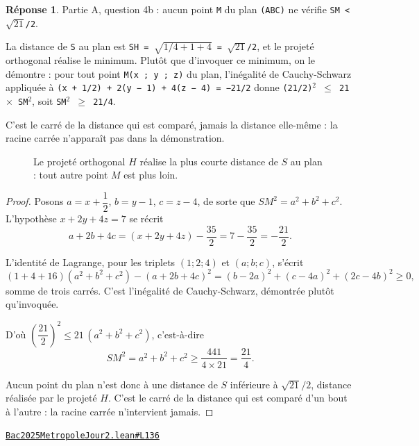 \documentclass[11pt,a4paper]{article}
\theoremstyle{definition}
\theoremstyle{plain}
\theoremstyle{definition}
\newtheorem*{reponse}{Réponse}
\newcommand{\source}[2]{\par\smallskip\noindent\hfill{\footnotesize\href{#1}{\texttt{#2}}}\par\smallskip}
\begin{document}
\begin{reponse}
Partie A, question 4b : aucun point \texttt{M} du plan \texttt{(ABC)} ne vérifie \texttt{SM < \(\sqrt{21}\)/2}.

La distance de \texttt{S} au plan est \texttt{SH = \(\sqrt{1/4 + 1 + 4}\) = \(\sqrt{21}\)/2}, et le projeté orthogonal
réalise le minimum. Plutôt que d'invoquer ce minimum, on le démontre : pour tout point
\texttt{M(x ; y ; z)} du plan, l'inégalité de Cauchy-Schwarz appliquée à
\texttt{(x + 1/2) + 2(y − 1) + 4(z − 4) = −21/2} donne \texttt{(21/2)\(^{2}\) \(\le\) 21 \(\times\) SM\(^{2}\)}, soit
\texttt{SM\(^{2}\) \(\ge\) 21/4}.

C'est le carré de la distance qui est comparé, jamais la distance elle-même : la
racine carrée n'apparaît pas dans la démonstration.
\end{reponse}

\begin{figure}[h]
\centering

\caption{Le projeté orthogonal \(H\) réalise la plus courte distance de \(S\) au plan : tout autre point \(M\) est plus loin.}
\end{figure}
\begin{proof}
Posons $a = x + \dfrac{1}{2}$, $b = y - 1$, $c = z - 4$, de sorte que $SM^2 = a^2 + b^2 +
c^2$. L'hypothèse $x + 2y + 4z = 7$ se récrit
\[ a + 2b + 4c = (x + 2y + 4z) - \frac{35}{2} = 7 - \frac{35}{2} = -\frac{21}{2} . \]

L'identité de Lagrange, pour les triplets $(1 ; 2 ; 4)$ et $(a ; b ; c)$, s'écrit
\[ (1 + 4 + 16)(a^2 + b^2 + c^2) - (a + 2b + 4c)^2
   = (b - 2a)^2 + (c - 4a)^2 + (2c - 4b)^2 \ge 0 , \]
somme de trois carrés. C'est l'inégalité de Cauchy-Schwarz, démontrée plutôt qu'invoquée.

D'où $\left(\dfrac{21}{2}\right)^2 \le 21\,(a^2 + b^2 + c^2)$, c'est-à-dire
\[ SM^2 = a^2 + b^2 + c^2 \ge \frac{441}{4 \times 21} = \frac{21}{4} . \]

Aucun point du plan n'est donc à une distance de $S$ inférieure à
$\sqrt{21}/2$, distance réalisée par le projeté $H$. C'est le carré de la distance qui est
comparé d'un bout à l'autre : la racine carrée n'intervient jamais.
\end{proof}
\source{https://github.com/Commutator-IO/learn-lean/blob/main/exams/2025/Bac2025MetropoleJour2.lean\#L136}{Bac2025MetropoleJour2.lean\#L136}
\end{document}
